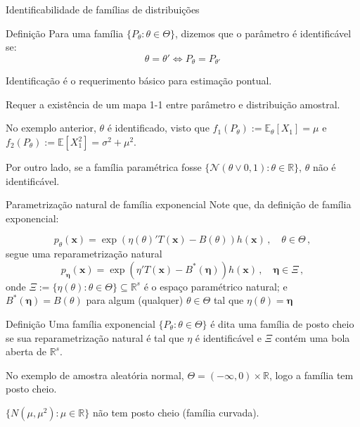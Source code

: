 \documentclass[11pt]{beamer}
\newenvironment{halfwideitemize}{\itemize\addtolength{\itemsep}{0.5em}}{\enditemize}
\begin{document}
	\begin{frame}{Identificabilidade de famílias de distribuições}
		\begin{block}{Definição}
			Para uma família $\{P_\theta: \theta \in \Theta\}$, dizemos que o parâmetro é identificável se:
			$$\theta = \theta' \iff P_{\theta} = P_{\theta'}$$
		\end{block}
		\begin{halfwideitemize}
			\item Identificação é o requerimento básico para estimação pontual.
			\begin{halfwideitemize}
				\item Requer a existência de um mapa 1-1 entre parâmetro e distribuição amostral.
			\end{halfwideitemize}
			\item No exemplo anterior, $\theta$ é identificado, visto que $f_1(P_\theta) := \mathbb{E}_\theta[X_1] = \mu$ e $f_2(P_\theta) := \mathbb{E}[X_1^2] = \sigma^2 + \mu^2$.
			\item Por outro lado, se a família paramétrica fosse $\{\mathcal{N}( \theta \lor 0, 1): \theta \in \mathbb{R}\}$, $\theta$ não é identificável.
		\end{halfwideitemize}
	\end{frame}
	\begin{frame}{Parametrização natural de família exponencial}
		Note que, da definição de família exponencial:
		
		$$p_\theta(\boldsymbol{x}) = \exp(\eta(\theta)'T(\boldsymbol{x}) -B(\theta)) h(\boldsymbol{x}) \, , \quad  \theta \in \Theta \, ,$$
		segue uma reparametrização {\color{blue}natural}
		$$p_{\boldsymbol{\eta}}(\boldsymbol{x}) = \exp(\eta'T(\boldsymbol{x}) -B^*(\boldsymbol{\eta})) h(\boldsymbol{x}) \, , \quad \boldsymbol{\eta} \in \Xi \, ,$$
		onde $\Xi := \{ \eta(\theta): \theta \in \Theta\} \subseteq \mathbb{R}^s$ é o {\color{blue}espaço paramétrico natural}; e $B^*(\boldsymbol{\eta}) = B(\theta)$ para algum (qualquer) $\theta \in \Theta$ tal que $\eta(\theta) = \boldsymbol{\eta}$
		
		\begin{block}{Definição}
			Uma família exponencial $\{P_\theta: \theta \in \Theta\}$ é dita uma família de posto cheio se sua reparametrização natural é tal que $\eta$ é identificável e $\Xi$ contém uma bola aberta de $\mathbb{R}^s$.
		\end{block}
		\begin{halfwideitemize}
			\item No exemplo de amostra aleatória normal, $\Theta = (-\infty,0) \times \mathbb{R}$, logo a família tem posto cheio.
			\item $\{N(\mu, \mu^2): \mu \in \mathbb{R}\}$ não tem posto cheio (família curvada).
		\end{halfwideitemize}
	\end{frame}
\end{document}
